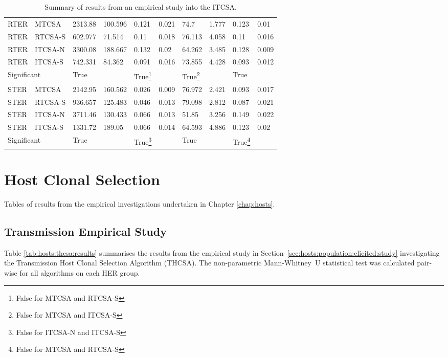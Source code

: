 \begin{table}[H]
\begin{minipage}{\textwidth}
\begin{tabular}{llllllllll}
		\midrule
		RTER & MTCSA & 2313.88 & 100.596 & 0.121 & 0.021 & 74.7 & 1.777 & 0.123 & 0.01 \\ 
		RTER & RTCSA-S & 602.977 & 71.514 & 0.11 & 0.018 & 76.113 & 4.058 & 0.11 & 0.016 \\ 
		RTER & ITCSA-N & 3300.08 & 188.667 & 0.132 & 0.02 & 64.262 & 3.485 & 0.128 & 0.009 \\ 
		RTER & ITCSA-S & 742.331 & 84.362 & 0.091 & 0.016 & 73.855 & 4.428 & 0.093 & 0.012 \\ 
		\multicolumn{2}{l}{Significant} & True &  & True\footnote{False for MTCSA and RTCSA-S} &  & True\footnote{False for MTCSA and ITCSA-S} &  & True &  \\ 
		\midrule
		STER & MTCSA & 2142.95 & 160.562 & 0.026 & 0.009 & 76.972 & 2.421 & 0.093 & 0.017 \\ 
		STER & RTCSA-S & 936.657 & 125.483 & 0.046 & 0.013 & 79.098 & 2.812 & 0.087 & 0.021 \\ 
		STER & ITCSA-N & 3711.46 & 130.433 & 0.066 & 0.013 & 51.85 & 3.256 & 0.149 & 0.022 \\ 
		STER & ITCSA-S & 1331.72 & 189.05 & 0.066 & 0.014 & 64.593 & 4.886 & 0.123 & 0.02 \\ 
		\multicolumn{2}{l}{Significant} & True & & True\footnote{False for ITCSA-N and ITCSA-S} &  & True &  & True\footnote{False for MTCSA and RTCSA-S} &  \\ 
		\bottomrule
		\end{tabular}	
		\end{minipage}
	\caption{Summary of results from an empirical study into the ITCSA.}
	\label{tab:tissues:itcsa:results}
\end{table}



%
%
\section{Host Clonal Selection}
\label{appendix:results:hosts}
Tables of results from the empirical investigations undertaken in Chapter \ref{chap:hosts}.

%
%
\subsection{Transmission Empirical Study}
\label{appendix:results:hosts:transmission}
Table \ref{tab:hosts:thcsa:results} summarises the results from the empirical study in Section~\ref{sec:hosts:population:elicited:study} investigating the Transmission Host Clonal Selection Algorithm (THCSA). The non-parametric Mann-Whitney~U statistical test was calculated pair-wise for all algorithms on each HER group.

